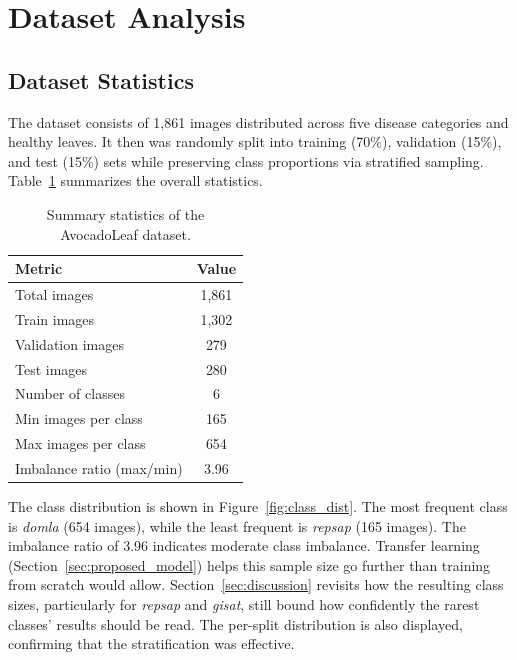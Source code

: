 \section{Dataset Analysis}
\label{sec:dataset_analysis}

\subsection{Dataset Statistics}

The dataset consists of 1,861 images distributed across five disease categories and healthy leaves. It then was randomly split into training (70\%), validation (15\%), and test (15\%) sets while preserving class proportions via stratified sampling. Table~\ref{tab:dataset_stats} summarizes the overall statistics.

\begin{table}[htbp]
\centering
\caption{Summary statistics of the AvocadoLeaf dataset.}
\label{tab:dataset_stats}
\begin{tabular}{l c}
\toprule
\textbf{Metric} & \textbf{Value} \\
\midrule
Total images & 1,861 \\
Train images & 1,302 \\
Validation images & 279 \\
Test images & 280 \\
Number of classes & 6 \\
Min images per class & 165 \\
Max images per class & 654 \\
Imbalance ratio (max/min) & 3.96 \\
\bottomrule
\end{tabular}
\end{table}

The class distribution is shown in Figure~\ref{fig:class_dist}. The most frequent class is \textit{domla} (654 images), while the least frequent is \textit{repsap} (165 images). The imbalance ratio of 3.96 indicates moderate class imbalance. Transfer learning (Section~\ref{sec:proposed_model}) helps this sample size go further than training from scratch would allow. Section~\ref{sec:discussion} revisits how the resulting class sizes, particularly for \textit{repsap} and \textit{gisat}, still bound how confidently the rarest classes' results should be read. The per-split distribution is also displayed, confirming that the stratification was effective.


